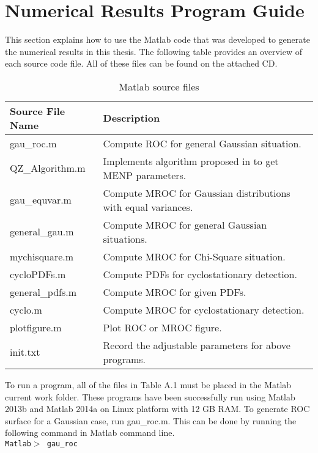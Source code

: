 \resetdatestamp

\chapter{Numerical Results Program Guide}
\label{A:LaTeXmacros}

This section explains how to use the Matlab code that was developed to generate the numerical results in this thesis.  The following table provides an overview of each source code file. All of these files can be found on the attached CD. 

\begin{table}[h]
\begin{tabular}{l|p{350pt}}
\hline
\hline
Source File Name                  & Description                                                                \\ \hline
gau\_roc.m      & Compute ROC for general Gaussian situation.              \\
QZ\_Algorithm.m & Implements algorithm proposed in \cite{zhang2000efficient} to get MENP parameters.                \\
gau\_equvar.m   & Compute MROC for Gaussian distributions with equal variances. \\
general\_gau.m         & Compute MROC for general Gaussian situations.                   \\
mychisquare.m            & Compute MROC for Chi-Square situation.                        \\
cycloPDFs.m              & Compute PDFs for cyclostationary detection.                 \\ 
general\_pdfs.m           & Compute MROC for given PDFs.                                 \\
cyclo.m				     & Compute MROC for cyclostationary detection.             \\		
plotfigure.m             & Plot ROC or MROC figure. \\
init.txt                   & Record the adjustable parameters for above programs.         \\
\hline
\end{tabular}
\label{filelist}
\caption{Matlab source files}
\end{table}

To run a program, all of the files in Table A.1 must be placed in the Matlab current work folder. These programs have been successfully run using Matlab 2013b and Matlab 2014a on Linux platform with 12 GB RAM.  
To generate ROC surface for a Gaussian case, run gau\_roc.m. This can be done by running the following command in Matlab command line.
\\\texttt{Matlab$>$ gau\_roc}

